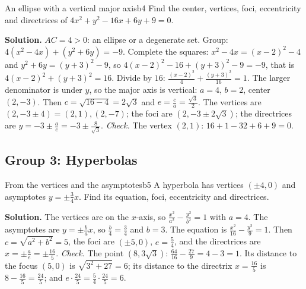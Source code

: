 \documentclass[11pt]{article}
\begin{document}
\begin{exmp}{An ellipse with a vertical major axis}{b4}
Find the center, vertices, foci, eccentricity and directrices of $4x^2+y^2-16x+6y+9=0$.

\textbf{Solution.} $AC=4>0$: an ellipse or a degenerate set. Group: $4\left(x^2-4x\right)+\left(y^2+6y\right)=-9$. Complete the squares: $x^2-4x=(x-2)^2-4$ and $y^2+6y=(y+3)^2-9$, so $4(x-2)^2-16+(y+3)^2-9=-9$, that is $4(x-2)^2+(y+3)^2=16$. Divide by $16$: $\frac{(x-2)^2}{4}+\frac{(y+3)^2}{16}=1$. The larger denominator is under $y$, so the major axis is vertical: $a=4$, $b=2$, center $(2,-3)$. Then $c=\sqrt{16-4}=2\sqrt3$ and $e=\frac ca=\frac{\sqrt3}2$. The vertices are $(2,-3\pm4)=(2,1),(2,-7)$; the foci are $\left(2,-3\pm2\sqrt3\right)$; the directrices are $y=-3\pm\frac ae=-3\pm\frac8{\sqrt3}$.
\emph{Check.} The vertex $(2,1)$: $16+1-32+6+9=0$.
\end{exmp}

\subsection*{Group 3: Hyperbolas}

\begin{exmp}{From the vertices and the asymptotes}{b5}
A hyperbola has vertices $(\pm4,0)$ and asymptotes $y=\pm\frac34x$. Find its equation, foci, eccentricity and directrices.

\textbf{Solution.} The vertices are on the $x$-axis, so $\frac{x^2}{a^2}-\frac{y^2}{b^2}=1$ with $a=4$. The asymptotes are $y=\pm\frac bax$, so $\frac b4=\frac34$ and $b=3$. The equation is $\frac{x^2}{16}-\frac{y^2}9=1$. Then $c=\sqrt{a^2+b^2}=5$, the foci are $(\pm5,0)$, $e=\frac54$, and the directrices are $x=\pm\frac ae=\pm\frac{16}5$.
\emph{Check.} The point $\left(8,3\sqrt3\right)$: $\frac{64}{16}-\frac{27}9=4-3=1$. Its distance to the focus $(5,0)$ is $\sqrt{3^2+27}=6$; its distance to the directrix $x=\frac{16}5$ is $8-\frac{16}5=\frac{24}5$; and $e\cdot\frac{24}5=\frac54\cdot\frac{24}5=6$.
\end{exmp}
\end{document}
